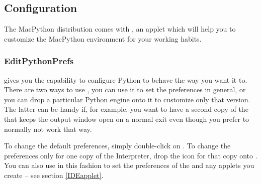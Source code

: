  


\subsection{Configuration \label{configuration}}

The MacPython distribution comes with , an
applet which will help you to customize the MacPython environment for
your working habits.
 
\subsubsection{EditPythonPrefs\label{EditPythonPrefs}}

 gives you the capability to configure Python
to behave the way you want it to.  There are two ways to use
, you can use it to set the preferences in
general, or you can drop a particular Python engine onto it to
customize only that version. The latter can be handy if, for example,
you want to have a second copy of the  that
keeps the output window open on a normal exit even though you prefer
to normally not work that way.

To change the default preferences, simply double-click on
. To change the preferences only for one copy
of the Interpreter, drop the icon for that copy onto
.  You can also use 
in this fashion to set the preferences of the  and
any applets you create -- see section %
\ref{IDEapplet}.

